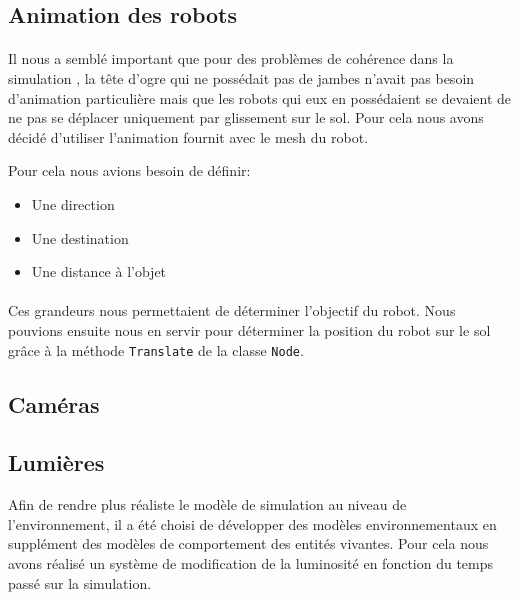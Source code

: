 \subsection{Animation des robots}

\paragraph{}
Il nous a semblé important que pour des problèmes de cohérence dans la
simulation , la tête d'ogre qui ne possédait pas de jambes n'avait pas besoin
d'animation particulière mais que les robots qui eux en possédaient se devaient de
ne pas se déplacer uniquement par glissement sur le sol. Pour cela nous avons
décidé d'utiliser l'animation fournit avec le mesh du robot. 

Pour cela nous avions besoin de définir:\\
\begin{itemize}
  \item Une direction
  \item Une destination
  \item Une distance à l'objet
\end{itemize}

\paragraph{}
Ces grandeurs nous permettaient de déterminer l'objectif du robot. Nous pouvions
ensuite nous en servir pour déterminer la position du robot sur le sol grâce à
la méthode \verb!Translate! de la classe \verb!Node!.

\subsection{Caméras}
\subsection{Lumières}

Afin de rendre plus réaliste le modèle de simulation au niveau de
l'environnement, il a été choisi de développer des modèles environnementaux en
supplément des modèles de comportement des entités vivantes. Pour cela nous
avons réalisé un système de modification de la luminosité en fonction du temps
passé sur la simulation.

\paragraph{}

